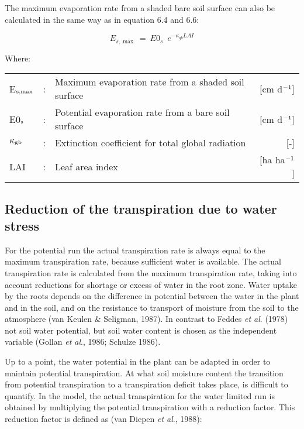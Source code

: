 The maximum evaporation rate from a shaded bare soil surface can also be calculated in
the same way as in equation 6.4 and 6.6:

\begin{equation}
E_{s,\max } ~=~ E0 _{s} \,\,\, e ^{-\kappa  _{gb} LAI}
\end{equation}

Where:\\[5pt]
\begin{tabularx}{\textwidth}{llXr}
E$_{{\rm s,max}}$ &:& Maximum evaporation rate from a shaded 
    soil surface & [cm d$^{{\rm -1}}$]\\
E0$_{{\rm s}}$ &:& Potential evaporation rate from a bare soil 
    surface & [cm d$^{{\rm -1}}$]\\
$\kappa$$_{{\rm gb}}$ &:& Extinction coefficient for total global radiation & [-]\\
LAI &:& Leaf area index & [ha ha$^{{\rm -1}}$]\\
\end{tabularx}

\subsection{Reduction of the transpiration due to water stress}

For the potential run the actual transpiration rate is always equal to the maximum
transpira\-tion rate, because sufficient water is available. The actual transpiration rate is
calculated from the maximum transpiration rate, taking into account reductions for
shortage or excess of water in the root zone. Water uptake by the roots depends on the
difference in potential between the water in the plant and in the soil, and on the resistance
to transport of moisture from the soil to the atmosphere (van Keulen \& Seligman, 1987).
In contrast to Feddes {\it et al\/}. (1978) not soil water potential, but soil water content is
chosen as the independent variable (Gollan {\it et al\/}., 1986; Schulze 1986).

Up to a point, the water potential in the plant can be adapted in order to maintain
potential transpiration. At what soil moisture content the transition from potential
transpiration to a transpiration deficit takes place, is difficult to quantify. In the model,
the actual transpira\-tion for the water limited run is obtained by multiplying the potential
transpiration with a reduction factor. This reduction factor is defined as (van Diepen {\it et
al}., 1988):

